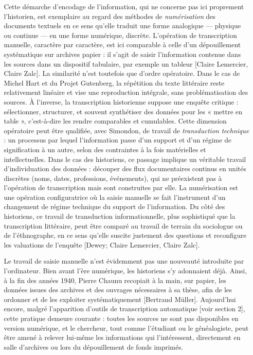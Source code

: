 Cette démarche d'encodage de l'information, qui ne concerne pas ici proprement l’historien, est exemplaire au regard des méthodes de \emph{numérisation} des documents textuels en ce sens qu’elle traduit une forme analogique — physique ou continue — en une forme numérique, discrète. L’opération de transcription manuelle, caractère par caractère, est ici comparable à celle d’un dépouillement systématique sur archives papier : il s’agit de saisir l’information contenue dans les sources dans un dispositif tabulaire, par exemple un tableur [Claire Lemercier, Claire Zalc]. La similarité n’est toutefois que d’ordre opératoire. Dans le cas de Michel Hart et du Projet Gutenberg, la répétition du texte littéraire reste relativement linéaire et vise une reproduction intégrale, sans problématisation des sources. À l’inverse, la transcription historienne suppose une enquête critique : sélectionner, structurer, et souvent synthétiser des données pour les « mettre en table », c’est-à-dire les rendre comparables et cumulables. Cette dimension opératoire peut être qualifiée, avec Simondon, de travail de \emph{transduction technique} : un processus par lequel l’information passe d’un support et d’un régime de signification à un autre, selon des contraintes à la fois matérielles et intellectuelles. Dans le cas des historiens, ce passage implique un véritable travail d’individuation des données : découper des flux documentaires continus en unités discrètes (noms, dates, professions, événements), qui ne préexistent pas à l’opération de transcription mais sont construites par elle. La numérisation est une opération configuratrice où la saisie manuelle se fait l’instrument d’un changement de régime technique du support de l'information. Du côté des historiens, ce travail de transduction informationnelle, plus sophistiqué que la transcription littéraire, peut être comparé au travail de terrain du sociologue ou de l'éthnographe, en ce sens qu'elle suscite justement des questions et reconfigure les valuations de l'enquête [Dewey; Claire Lemercier, Claire Zalc].

Le travail de saisie manuelle n’est évidemment pas une nouveauté introduite par l’ordinateur. Bien avant l’ère numérique, les historiens s’y adonnaient déjà. Ainsi, à la fin des années 1940, Pierre Chaunu recopiait à la main, sur papier, les données issues des archives et des ouvrages nécessaires à sa thèse, afin de les ordonner et de les exploiter systématiquement [Bertrand Müller]. Aujourd’hui encore, malgré l’apparition d’outils de transcription automatique [voir section 2], cette pratique demeure courante : toutes les sources ne sont pas disponibles en version numérique, et le chercheur, tout comme l’étudiant ou le généalogiste, peut être amené à relever lui-même les informations qui l’intéressent, directement en salle d’archives ou lors du dépouillement de fonds imprimés.

